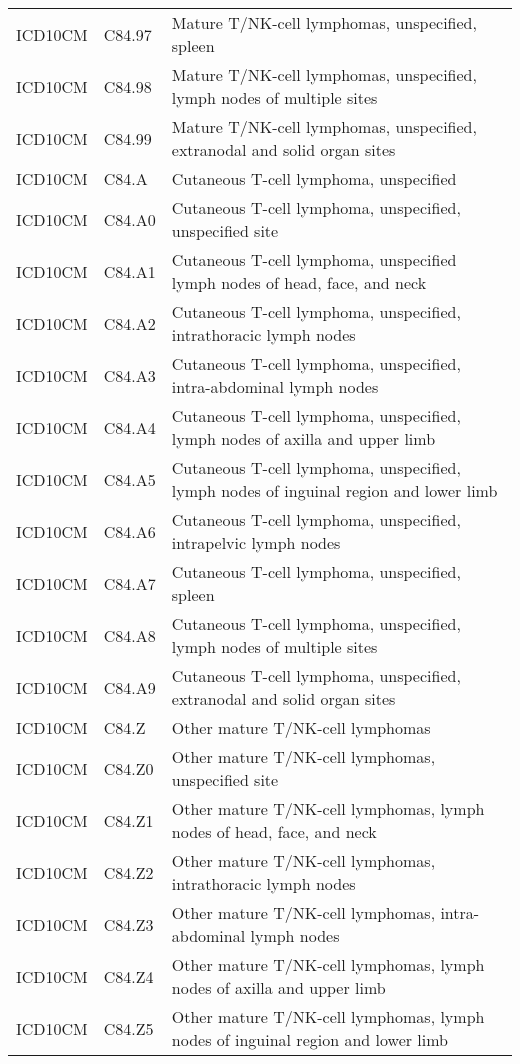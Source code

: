 \begin{table}[ht]
\begin{tabular}{lll}
  ICD10CM & C84.97 & Mature T/NK-cell lymphomas, unspecified, spleen \\ 
  ICD10CM & C84.98 & Mature T/NK-cell lymphomas, unspecified, lymph nodes of multiple sites \\ 
  ICD10CM & C84.99 & Mature T/NK-cell lymphomas, unspecified, extranodal and solid organ sites \\ 
  ICD10CM & C84.A & Cutaneous T-cell lymphoma, unspecified \\ 
  ICD10CM & C84.A0 & Cutaneous T-cell lymphoma, unspecified, unspecified site \\ 
  ICD10CM & C84.A1 & Cutaneous T-cell lymphoma, unspecified lymph nodes of head, face, and neck \\ 
  ICD10CM & C84.A2 & Cutaneous T-cell lymphoma, unspecified, intrathoracic lymph nodes \\ 
  ICD10CM & C84.A3 & Cutaneous T-cell lymphoma, unspecified, intra-abdominal lymph nodes \\ 
  ICD10CM & C84.A4 & Cutaneous T-cell lymphoma, unspecified, lymph nodes of axilla and upper limb \\ 
  ICD10CM & C84.A5 & Cutaneous T-cell lymphoma, unspecified, lymph nodes of inguinal region and lower limb \\ 
  ICD10CM & C84.A6 & Cutaneous T-cell lymphoma, unspecified, intrapelvic lymph nodes \\ 
  ICD10CM & C84.A7 & Cutaneous T-cell lymphoma, unspecified, spleen \\ 
  ICD10CM & C84.A8 & Cutaneous T-cell lymphoma, unspecified, lymph nodes of multiple sites \\ 
  ICD10CM & C84.A9 & Cutaneous T-cell lymphoma, unspecified, extranodal and solid organ sites \\ 
  ICD10CM & C84.Z & Other mature T/NK-cell lymphomas \\ 
  ICD10CM & C84.Z0 & Other mature T/NK-cell lymphomas, unspecified site \\ 
  ICD10CM & C84.Z1 & Other mature T/NK-cell lymphomas, lymph nodes of head, face, and neck \\ 
  ICD10CM & C84.Z2 & Other mature T/NK-cell lymphomas, intrathoracic lymph nodes \\ 
  ICD10CM & C84.Z3 & Other mature T/NK-cell lymphomas, intra-abdominal lymph nodes \\ 
  ICD10CM & C84.Z4 & Other mature T/NK-cell lymphomas, lymph nodes of axilla and upper limb \\ 
  ICD10CM & C84.Z5 & Other mature T/NK-cell lymphomas, lymph nodes of inguinal region and lower limb \\ 

\end{tabular}
\end{table}
